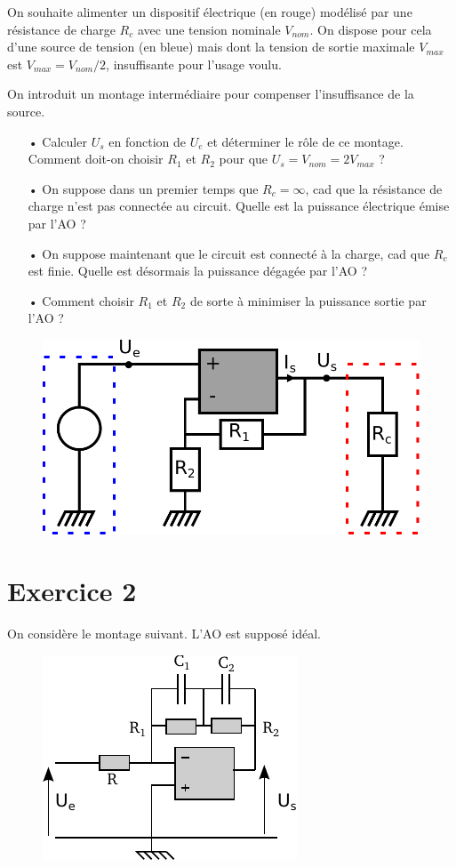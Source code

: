 \documentclass{report}
\begin{document}
On souhaite alimenter un dispositif électrique (en rouge) modélisé par une résistance de charge $R_c$ avec une tension nominale $V_{nom}$. On dispose pour cela d'une source de tension (en bleue) mais dont la tension de sortie maximale $V_{max}$ est $V_{max} = V_{nom}/2$, insuffisante pour l'usage voulu.

On introduit un montage intermédiaire pour compenser l'insuffisance de la source. 

\begin{itemize}
	\item[•] Calculer $U_s$ en fonction de $U_e$ et déterminer le rôle de ce montage. Comment doit-on choisir $R_1$ et $R_2$ pour que $U_s = V_{nom}=2V_{max}$ ?
	\item[•]  On suppose dans un premier temps que $R_c=\infty$, cad que la résistance de charge n'est pas connectée au circuit. Quelle est la puissance électrique émise par l'AO ?
	\item[•] On suppose maintenant que le circuit est connecté à la charge, cad que $R_c$ est finie. Quelle est désormais la puissance dégagée par l'AO ?
	\item[•] Comment choisir $R_1$ et $R_2$ de sorte à minimiser la puissance sortie par l'AO ?
\end{itemize}

\begin{figure}[!h]
\centering
\includegraphics[width=0.5\linewidth]{puissance_AO.pdf}
\end{figure}

\newpage

\section*{Exercice 2}

On considère le montage suivant. L'AO est supposé idéal.

\begin{figure}[!h]
\centering
\includegraphics[width=0.5\linewidth]{circuit_6.pdf}
\end{figure}
\end{document}
